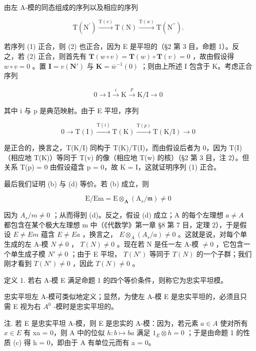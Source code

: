 由左 A-模的同态组成的序列以及相应的序列

\[
\mathrm{T} \left(\mathrm{N} ^ {\prime}\right) \xrightarrow {\mathrm{T} (v)} \mathrm{T} (\mathrm{N}) \xrightarrow {\mathrm{T} (w)} \mathrm{T} \left(\mathrm{N} ^ {\prime \prime}\right).\tag{2}
\]

若序列 (1) 正合，则 (2) 也正合，因为 E 是平坦的（§2 第 3 目，命题 1）。反之，若 (2) 正合，则首先有 \(\mathbf{T}(w \circ v) = \mathbf{T}(w) \circ \mathbf{T}(v) = 0\) ，故由假设得 \(w \circ v = 0\) 。置 \(\mathbf{I} = v(\mathbf{N}')\) 与 \(\mathbf{K} = \overline{w}^{-1}(0)\) ；则由上所述 I 包含于 K。考虑正合序列

\[
0 \longrightarrow \mathrm{I} \stackrel {i} {\longrightarrow} \mathrm{K} \stackrel {p} {\longrightarrow} \mathrm{K} / \mathrm{I} \longrightarrow 0
\]

其中 i 与 p 是典范映射。由于 E 平坦，序列

\[
0 \longrightarrow \mathrm{T} (\mathrm{I}) \xrightarrow {\mathrm{T} (i)} \mathrm{T} (\mathrm{K}) \xrightarrow {\mathrm{T} (p)} \mathrm{T} (\mathrm{K} / \mathrm{I}) \longrightarrow 0
\]

是正合的，换言之，T(K/I) 同构于 T(K)/T(I)，而由假设后者为 0，因为 T(I)（相应地 T(K)）等同于 T(v) 的像（相应地 T(w) 的核）（§2 第 3 目，注 2）。但关系 T(p) = 0 由假设蕴含 p = 0，故 K = I，这就证明序列 (1) 正合。

最后我们证明 (b) 与 (d) 等价。若 (b) 成立，则

\[
\mathrm{E} / \mathrm{Em} = \mathrm{E} \otimes_ {\mathbf {A}} (\mathrm{A} _ {s} / \mathfrak {m}) \neq 0
\]

因为 \(A_{s}/m \neq 0\) ；从而得到 (d)。反之，假设 (d) 成立；A 的每个左理想 \(a \neq A\) 都包含在某个极大左理想 m 中（《代数学》第一章 §8 第 7 目，定理 2），于是假设 \(E \neq Em\) 蕴含 \(E \neq Ea\) ，换言之， \(E \otimes_{A} (A_{s}/a) \neq 0\) 。这就是说，对每个单生成的左 A-模 \(N \neq 0\) ， \(T(N) \neq 0\) 。现在若 N 是任一左 A-模 \(\neq 0\) ，它包含一个单生成子模 \(N' \neq 0\) ；由于 E 平坦， \(T(N')\) 等同于 \(T(N)\) 的一个子群；我们刚才看到 \(T(N') \neq 0\) ，因此 \(T(N) \neq 0\) 。

定义 1. 若右 A-模 E 满足命题 1 的四个等价条件，则称它为忠实平坦模。

忠实平坦左 A-模可类似地定义；显然，为使左 A-模 E 是忠实平坦的，必须且只需 E 视为右 \(A^{0}\) -模时是忠实平坦的。

注. 若 E 是忠实平坦 A-模，则 E 是忠实的 A-模：因为，若元素 \(a \in A\) 使对所有 \(x \in E\) 有 xa = 0，则 A 中的位似 \(h: b \mapsto ba\) 满足 \(1_{E} \otimes h = 0\) ；于是由命题 1 的性质 (c) 得 h = 0，即由于 A 有单位元而有 a = 0。

